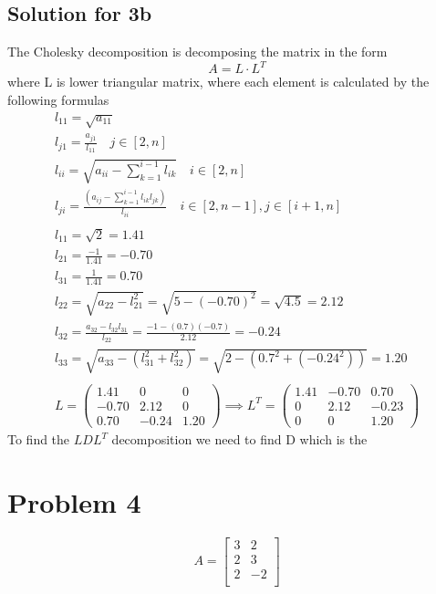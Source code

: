 \documentclass[a4paper,fleqn,12pt]{article}
\begin{document}
\subsection{Solution for 3b}
The Cholesky decomposition is decomposing the matrix in the form 
$$
A = L \cdot L^T
$$
where L is lower triangular matrix, where each element is calculated by the following formulas
\begin{gather*}
l_{11} = \sqrt{a_{11}}   \\
l_{j1} = \frac{a_{j1}}{l_{11}} \quad  j \in [2, n] \\
l_{ii} = \sqrt{a_{ii} - \sum_{k=1} ^{i-1} l_{ik}} \quad i \in [2, n] \\
l_{ji} = \frac{ \left( a_{ij} - \sum_{k=1} ^{i-1} l_{ik} l_{jk} \right)}{l_{ii}} \quad i \in [2, n-1], j \in [i+1, n] \\
\\
l_{11} = \sqrt{2} = 1.41 \\
l_{21} = \frac{-1}{1.41} = - 0.70 \\
l_{31} = \frac{1}{1.41}  = 0.70 \\
l_{22} = \sqrt{a_{22} - l_{21} ^2} = \sqrt{5 - (-0.70)^2} = \sqrt{4.5} = 2.12 \\
l_{32} = \frac{a_{32} - l_{32}l_{31}}{l_{22}} = \frac{-1 -(0.7)(-0.7)}{2.12} = -0.24 \\
l_{33} = \sqrt{a_{33} - (l_{31} ^2 + l_{32} ^2)} = \sqrt{2 - (0.7^2 + (-0.24^2))} = 1.20\\
\\
L = 
\begin{pmatrix}
1.41 & 0 & 0 \\
-0.70 & 2.12 & 0 \\
0.70 & -0.24 & 1.20 
\end{pmatrix} \implies  
L^T = \begin{pmatrix}
1.41 & -0.70 & 0.70 \\
0 & 2.12 & -0.23 \\
0 & 0 & 1.20
\end{pmatrix}
\end{gather*}
To find the $LDL^T$ decomposition we need to find D which is the 
\newpage

\section{Problem 4}
$$
A = \begin{bmatrix}
3 & 2 \\
2 & 3 \\
2 & -2 \\
\end{bmatrix}
$$
\end{document}
